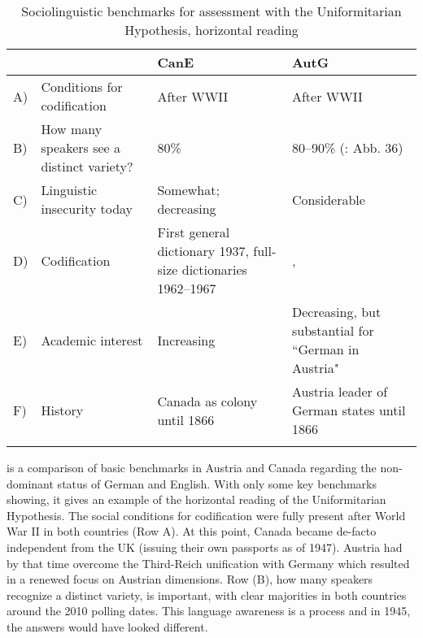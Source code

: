 \documentclass[output=paper]{langscibook}
\begin{document}
\begin{table}
\footnotesize
\begin{tabularx}{\textwidth}{lQQQ}
\lsptoprule
& & CanE & AutG \\
\midrule
A) & Conditions for codification & After WWII & After WWII \\
\midrule
B) & How many speakers see a distinct variety? & 80\% \citep[234]{Dollinger2019a}  & 80--90\% (\citealt{DeCilliaRansmayr2019}: Abb. 36) \\
\midrule
C) & Linguistic insecurity today & Somewhat; decreasing & Considerable \\
\midrule
D) & Codification & First general dictionary 1937, full-size dictionaries 1962--1967  & \citet{Lewi1875}, \citet{Wittgenstein1926} \\
\midrule
E) & Academic interest & Increasing & Decreasing, but substantial for ``German in Austria"\\
\midrule
F) & History & Canada as colony until 1866 & Austria leader of German states until 1866\\
\lspbottomrule
\end{tabularx}
\caption{Sociolinguistic benchmarks for assessment with the Uniformitarian Hypothesis, horizontal reading}
\label{tab:dollinger:1}
\end{table}

 is a comparison of basic benchmarks in Austria and Canada regarding the non-dominant status of German and English. With only some key benchmarks showing, it gives an example of the horizontal reading of the Uniformitarian Hypothesis. The social conditions for codification were fully present after World War II in both countries (Row A). At this point, Canada became de-facto independent from the UK (issuing their own passports as of 1947). Austria had by that time overcome the Third-Reich unification with Germany which resulted in a renewed focus on Austrian dimensions. Row (B), how many speakers recognize a distinct variety, is important, with clear majorities in both countries around the 2010 polling dates. This language awareness is a process and in 1945, the answers would have looked different.\pagebreak
\end{document}
